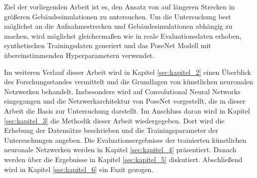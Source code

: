 Ziel der vorliegenden Arbeit ist es, den Ansatz von \citet{acharyaBIMPoseNetIndoorCamera2019} auf längeren Strecken in größeren Gebäudesimulationen zu untersuchen. Um die Untersuchung best möglichst an die Aufnahmestrecken und Gebäudesimulationen abhängig zu machen, wird möglichst gleichermaßen wie in \cite{acharyaBIMPoseNetIndoorCamera2019} reale Evaluationsdaten erhoben, synthetischen Trainingsdaten generiert und das PoseNet Modell mit übereinstimmenden Hyperparametern verwendet.


Im weiteren Verlauf dieser Arbeit wird in Kapitel \ref{sec:kapitel_2} einen Überblick des Forschungsstandes vermittelt und die Grundlagen von künstlichen neuronalen Netzwerken behandelt. Insbesondere wird auf Convolutional Neural Networks eingegangen und die Netzwerkarchitektur von PoseNet vorgestellt, die in dieser Arbeit die Basis zur Untersuchung darstellt. Im Anschluss daran wird in Kapitel \ref{sec:kapitel_3} die Methodik dieser Arbeit wiedergegeben. Dort wird die Erhebung der Datensätze beschrieben und die Trainingsparameter der Untersuchungen angeben. Die Evaluationsergebnisse der trainierten künstlichen neuronale Netzwerken werden in Kapitel \ref{sec:kapitel_4} präsentiert. Danach werden über die Ergebnisse in Kapitel \ref{sec:kapitel_5} diskutiert. Abschließend wird in Kapitel \ref{sec:kapitel_6} ein Fazit gezogen. 


